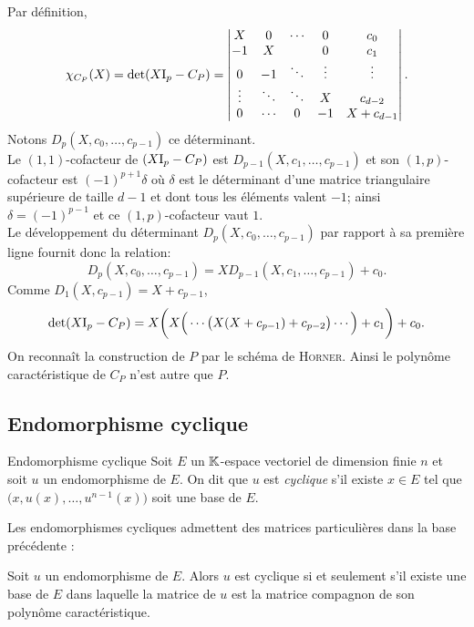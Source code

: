\begin{preuve}
    Par définition,
    $$
    \chi_{C_P}(X) = \det(X \mathrm{I}_p - C_P) = 
    \begin{vmatrix}
        X & 0 & \cdots & 0 & c_0 \\
        -1 & X & & 0 & c_1 \\
        0 & -1 & \ddots & \vdots & \vdots \\
        \vdots & \ddots & \ddots & X & c_{d-2} \\
        0 & \cdots & 0 & -1 & X + c_{d-1}
    \end{vmatrix}.
    $$
    Notons $D_p(X, c_0, \dots, c_{p-1})$ ce déterminant. \\
    Le $(1,1)$-cofacteur de $(X \mathrm{I}_p - C_P)$ est $D_{p-1}(X, c_1, \dots, c_{p-1})$ et son $(1,p)$-cofacteur est $(-1)^{p+1} \delta$ où $\delta$ est le déterminant d'une matrice triangulaire supérieure de taille $d-1$ et dont tous les éléments valent $-1$; ainsi $\delta = (-1)^{p-1}$ et ce $(1,p)$-cofacteur vaut $1$. \\
    Le développement du déterminant $D_p(X, c_0, \dots, c_{p-1})$ par rapport à sa première ligne fournit donc la relation:
    $$D_p(X, c_0, \dots, c_{p-1}) = X D_{p-1}(X, c_1, \dots, c_{p-1}) + c_0.$$
    Comme $D_1(X, c_{p-1}) = X + c_{p-1}$,
    $$\det(X \mathrm{I}_p - C_P) = X \bigg(X \Big(\cdots \big(X(X+c_{p-1}) + c_{p-2} \big) \cdots \Big) + c_1 \bigg) + c_0.$$
    On reconnaît la construction de $P$ par le schéma de \textsc{Horner}. Ainsi le polynôme caractéristique de $C_P$ n'est autre que $P$. 
\end{preuve} 

\subsection{Endomorphisme cyclique}

\begin{defi}{Endomorphisme cyclique}
    Soit $E$ un $\mathbb{K}$-espace vectoriel de dimension finie $n$ et soit $u$ un endomorphisme de $E$. On dit que $u$ est \emph{cyclique} s'il existe $x \in E$ tel que $\big(x, u(x), \dots, u^{n-1}(x) \big)$ soit une base de $E$. 
\end{defi}

Les endomorphismes cycliques admettent des matrices particulières dans la base précédente :

\begin{prop}{} 
    Soit $u$ un endomorphisme de $E$. Alors $u$ est cyclique si et seulement s'il existe une base de $E$ dans laquelle la matrice de $u$ est la matrice compagnon de son polynôme caractéristique.
\end{prop}

